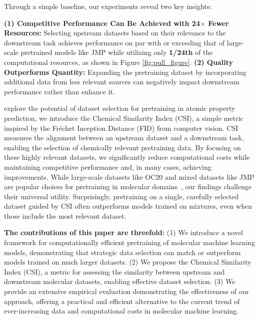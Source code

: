 Through a simple baseline, our experiments reveal two key insights:

\textbf{(1) Competitive Performance Can Be Achieved with 24$\mathbf{\times}$ Fewer Resources:} Selecting upstream datasets based on their relevance to the downstream task achieves performance on par with or exceeding that of large-scale pretrained models like JMP \cite{shoghimolecules} while utilizing only \textbf{1/24th} of the computational resources, as shown in Figure \ref{fig:pull_figure}.\newline 
\textbf{(2) Quality Outperforms Quantity:} Expanding the pretraining dataset by incorporating additional data from less relevant sources can negatively impact downstream performance rather than enhance it.





explore the potential of dataset selection for pretraining in atomic property prediction, we introduce the Chemical Similarity Index (CSI), a simple metric inspired by the Fréchet Inception Distance (FID) from computer vision. CSI measures the alignment between an upstream dataset and a downstream task, enabling the selection of chemically relevant pretraining data. By focusing on these highly relevant datasets, we significantly reduce computational costs while maintaining competitive performance and, in many cases, achieving improvements. While large-scale datasets like OC20 \cite{chanussot2021open, tran2023open} and mixed datasets like JMP \cite{shoghimolecules} are popular choices for pretraining in molecular domains~\cite{kolluru2022transfer, shoghimolecules}, our findings challenge their universal utility. %
Surprisingly, pretraining on a single, carefully selected dataset guided by CSI often outperforms models trained on mixtures, even when those include the most relevant dataset. 


\textbf{The contributions of this paper are threefold:} (1) We introduce a novel framework for computationally efficient pretraining of molecular machine learning models, demonstrating that strategic data selection can match or outperform models trained on much larger datasets. (2) We propose the Chemical Similarity Index (CSI), a metric for assessing the similarity between upstream and downstream molecular datasets, enabling effective dataset selection. (3) We provide an extensive empirical evaluation demonstrating the effectiveness of our approach, offering a practical and efficient alternative to the current trend of ever-increasing data and computational costs in molecular machine learning.
